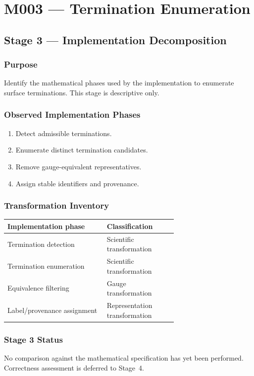 \chapter{M003 --- Termination Enumeration}

\section{Stage 3 --- Implementation Decomposition}

\subsection{Purpose}

Identify the mathematical phases used by the implementation to enumerate
surface terminations. This stage is descriptive only.

\subsection{Observed Implementation Phases}

\begin{enumerate}
\item Detect admissible terminations.
\item Enumerate distinct termination candidates.
\item Remove gauge-equivalent representatives.
\item Assign stable identifiers and provenance.
\end{enumerate}

\subsection{Transformation Inventory}

\begin{center}
\begin{tabular}{|p{0.42\linewidth}|p{0.26\linewidth}|}
\hline
Implementation phase & Classification\\
\hline
Termination detection & Scientific transformation\\
Termination enumeration & Scientific transformation\\
Equivalence filtering & Gauge transformation\\
Label/provenance assignment & Representation transformation\\
\hline
\end{tabular}
\end{center}

\subsection{Stage 3 Status}

No comparison against the mathematical specification has yet been
performed. Correctness assessment is deferred to Stage~4.
